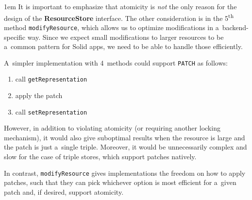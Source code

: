 \documentclass[10pt]{article}
\newenvironment{Note}
  {\begin{multicols}{3}%
     \parskip 1em}
  {\end{multicols}}
\begin{document}
\begin{Note}
It is important to emphasize
that atomicity is \emph{not} the only reason
for the design of the \textbf{ResourceStore} interface.
The other consideration is in the 5\textsuperscript{th} method
\verb!modifyResource!,
which allows us to optimize modifications in a~backend-specific way.
Since we expect small modifications to larger resources
to be a~common pattern for Solid apps,
we need to be able to handle those efficiently.

\columnbreak

A~simpler implementation with 4~methods
could support \verb!PATCH! as follows:
\begin{enumerate}
  \item call \verb!getRepresentation!
  \item apply the patch
  \item call \verb!setRepresentation!
\end{enumerate}

However, in addition to violating atomicity
(or requiring another locking mechanism),
it would also give suboptimal results
when the resource is large
and the patch is just a~single triple.
Moreover, it would be unnecessarily complex and slow
for the case of triple stores,
which support patches natively.

\columnbreak
In contrast,
\verb!modifyResource! gives implementations the freedom
on how to apply patches,
such that they can pick whichever option is most efficient
for a~given patch
and, if desired, support atomicity.

\end{Note}
\end{document}
